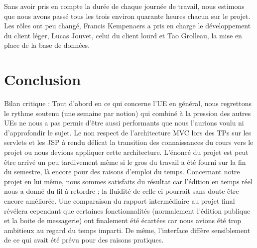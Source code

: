\documentclass[a4paper, 12pt]{article}
\begin{document}
Sans avoir pris en compte la durée de chaque journée de travail, nous estimons que nous avons passé tous les trois environ quarante heures chacun sur le projet.
Les rôles ont peu changé, Francis Kempenaers a pris en charge le développement du client léger, Lucas Jouvet, celui du client lourd et Tao Grolleau, la mise en place de la base de données. 

\section{Conclusion}

Bilan critique : Tout d'abord en ce qui concerne l'UE en général, nous regrettons le rythme soutenu (une semaine par notion) qui combiné à la pression des autres UEs ne nous a pas permis d'être aussi performants que nous l'aurions voulu ni d'approfondir le sujet. Le non respect de l'architecture MVC lors des TPs sur les servlets et les JSP à rendu délicat la transition des connaissances du cours vers le projet ou nous devions appliquer cette architecture. L'énoncé du projet est peut être arrivé un peu tardivement même si le gros du travail a été fourni sur la fin du semestre, là encore pour des raisons d'emploi du temps.
Concernant notre projet en lui même, nous sommes satisfaits du résultat car l'édition en temps réel nous a donné du fil à retordre ; la fluidité de celle-ci pourrait sans doute être encore améliorée. Une comparaison du rapport intermédiaire au projet final révélera cependant que certaines fonctionnalités (normalement l'édition publique et la boite de messagerie) ont finalement été écartées car nous avions été trop ambitieux au regard du temps imparti. De même, l'interface diffère sensiblement de ce qui avait été prévu pour des raisons pratiques.
\end{document}
